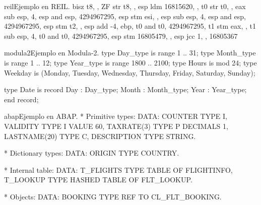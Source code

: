 
\begin{sourcecode}{reil}{Ejemplo en REIL.}
bisz t8, , ZF
str t8, , esp
ldm 16815620, , t0
str t0, , eax
sub esp, 4, esp
and esp, 4294967295, esp
stm esi, , esp
sub esp, 4, esp
and esp, 4294967295, esp
stm t2, , esp
add -4, ebp, t0
and t0, 4294967295, t1
stm eax, , t1
sub esp, 4, t0
and t0, 4294967295, esp
stm 16805479, , esp
jcc 1, , 16805367
\end{sourcecode}

\begin{sourcecode}{modula2}{Ejemplo en Modula-2.}
type Day_type   is range    1 ..   31;
type Month_type is range    1 ..   12;
type Year_type  is range 1800 .. 2100;
type Hours is mod 24;
type Weekday is (Monday, Tuesday, Wednesday, Thursday, Friday, Saturday, Sunday);

type Date is
   record
     Day   : Day_type;
     Month : Month_type;
     Year  : Year_type;
   end record;
\end{sourcecode}

\begin{sourcecode}{abap}{Ejemplo en ABAP.}
* Primitive types:
DATA: COUNTER      TYPE I,
      VALIDITY     TYPE I VALUE 60,
      TAXRATE(3)   TYPE P DECIMALS 1,
      LASTNAME(20) TYPE C,
      DESCRIPTION  TYPE STRING.

* Dictionary types:
DATA: ORIGIN       TYPE COUNTRY.

* Internal table:
DATA: T_FLIGHTS    TYPE TABLE OF FLIGHTINFO,
      T_LOOKUP     TYPE HASHED TABLE OF FLT_LOOKUP.

* Objects:
DATA: BOOKING      TYPE REF TO CL_FLT_BOOKING.
\end{sourcecode}


